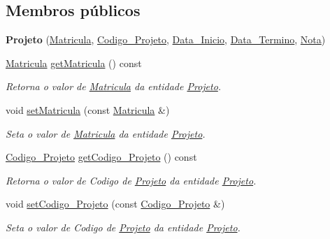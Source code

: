 \subsection*{\-Membros públicos}
\begin{DoxyCompactItemize}
\item 
\hypertarget{class_projeto_ab39919e206b2e33b6ab00bfa3bacd9a5}{
{\bfseries \-Projeto} (\hyperlink{class_matricula}{\-Matricula}, \hyperlink{class_codigo___projeto}{\-Codigo\-\_\-\-Projeto}, \hyperlink{class_data___inicio}{\-Data\-\_\-\-Inicio}, \hyperlink{class_data___termino}{\-Data\-\_\-\-Termino}, \hyperlink{class_nota}{\-Nota})}
\label{class_projeto_ab39919e206b2e33b6ab00bfa3bacd9a5}

\item 
\hyperlink{class_matricula}{\-Matricula} \hyperlink{class_projeto_ab5086bc8a75d77f2065639a836db28c9}{get\-Matricula} () const 
\begin{DoxyCompactList}\small\item\em \-Retorna o valor de \hyperlink{class_matricula}{\-Matricula} da entidade \hyperlink{class_projeto}{\-Projeto}. \end{DoxyCompactList}\item 
void \hyperlink{class_projeto_a2f220b68285d6acefe2b406520326969}{set\-Matricula} (const \hyperlink{class_matricula}{\-Matricula} \&)
\begin{DoxyCompactList}\small\item\em \-Seta o valor de \hyperlink{class_matricula}{\-Matricula} da entidade \hyperlink{class_projeto}{\-Projeto}. \end{DoxyCompactList}\item 
\hyperlink{class_codigo___projeto}{\-Codigo\-\_\-\-Projeto} \hyperlink{class_projeto_a1db1b38d1321c48894e74b7ac679b6e8}{get\-Codigo\-\_\-\-Projeto} () const 
\begin{DoxyCompactList}\small\item\em \-Retorna o valor de \-Codigo de \hyperlink{class_projeto}{\-Projeto} da entidade \hyperlink{class_projeto}{\-Projeto}. \end{DoxyCompactList}\item 
void \hyperlink{class_projeto_aba31c1e58bebad9aa88e4dfc41897bd5}{set\-Codigo\-\_\-\-Projeto} (const \hyperlink{class_codigo___projeto}{\-Codigo\-\_\-\-Projeto} \&)
\begin{DoxyCompactList}\small\item\em \-Seta o valor de \-Codigo de \hyperlink{class_projeto}{\-Projeto} da entidade \hyperlink{class_projeto}{\-Projeto}. \end{DoxyCompactList}\item 

\end{DoxyCompactItemize}
